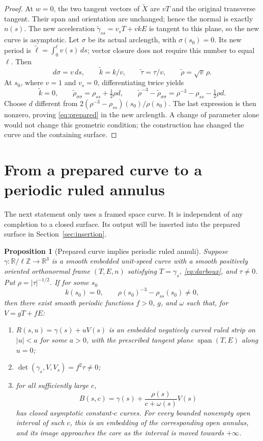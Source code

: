 \documentclass[11pt]{amsart}
\newtheorem{proposition}[theorem]{Proposition}
\theoremstyle{definition}
\newcommand{\R}{\mathbb R}
\begin{document}
\begin{proof}
At $w=0$, the two tangent vectors of $\widetilde X$ are $vT$
and the original transverse tangent. Their span and orientation
are unchanged; hence the normal is exactly $n(s)$.
The new acceleration
$\widetilde\gamma_{ss}=v_sT+vkE$ is tangent to this plane,
so the new curve is asymptotic.
Let $\sigma$ be its actual arclength, with $\sigma(s_0)=0$.
Its new period is
$\widetilde\ell=\int_0^\ell v(s)\,ds$; vector closure does not
require this number to equal $\ell$.
Then
\[
 d\sigma=v\,ds,\qquad
 \widetilde k=k/v,\qquad
 \widetilde\tau=\tau/v,\qquad
 \widetilde\rho=\sqrt v\,\rho.
\]
At $s_0$, where $v=1$ and $v_s=0$, differentiating twice yields
\[
 \widetilde k=0,\qquad
 \widetilde\rho_{\sigma\sigma}=\rho_{ss}+\tfrac12\rho d,
 \qquad
 \widetilde\rho^{-3}-\widetilde\rho_{\sigma\sigma}
 =\rho^{-3}-\rho_{ss}-\tfrac12\rho d .
\]
Choose $d$ different from
$2(\rho^{-3}-\rho_{ss})(s_0)/\rho(s_0)$.
The last expression is then nonzero, proving
\eqref{eq:prepared} in the new arclength. A change of parameter
alone would not change this geometric condition; the construction
has changed the curve and the containing surface.
\end{proof}

\section{From a prepared curve to a periodic ruled annulus}
\label{sec:ruled}

The next statement only uses a framed space curve. It is independent
of any completion to a closed surface. Its output will be inserted
into the prepared surface in Section~\ref{sec:insertion}.

\begin{proposition}[Prepared curve implies periodic ruled annuli]
\label{prop:ruled}
Suppose $\gamma:\R/\ell\mathbb Z\to\R^3$ is a smooth embedded
unit-speed curve with a smooth positively oriented orthonormal frame
$(T,E,n)$ satisfying $T=\gamma_s$, \eqref{eq:darboux}, and
$\tau\ne0$. Put $\rho=|\tau|^{-1/2}$.
If for some $s_0$
\[
 k(s_0)=0,\qquad
 \rho(s_0)^{-3}-\rho_{ss}(s_0)\ne0,
\]
then there exist smooth periodic functions $f>0$, $g$, and $\omega$
such that, for $V=gT+fE$:
\begin{enumerate}
 \item $R(s,u)=\gamma(s)+uV(s)$ is an embedded negatively curved
 ruled strip on $|u|<a$ for some $a>0$, with the prescribed tangent
 plane $\operatorname{span}(T,E)$ along $u=0$;
 \item $\det(\gamma_s,V,V_s)=f^2\tau\ne0$;
 \item for all sufficiently large $c$,
 \[
 B(s,c)=\gamma(s)+\frac{\rho(s)}{c+\omega(s)}V(s)
 \]
 has closed asymptotic constant-$c$ curves.
 For every bounded nonempty open interval of such $c$, this is an embedding of
 the corresponding open annulus, and its image approaches the
 core as the interval is moved towards $+\infty$.
\end{enumerate}
\end{proposition}
\end{document}
